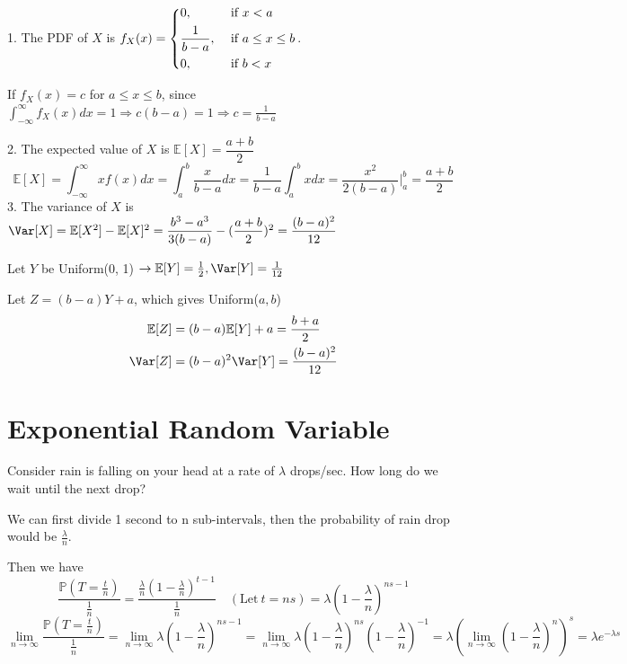 1. The PDF of \(X\) is \(f_X(x) = \begin{dcases}
        0, &\text{ if } x < a \\
        \frac{1}{b - a}, &\text{ if } a \leq x \leq b \\
        0 , &\text{ if } b < x
    \end{dcases}\). 
    
    If \(f_X(x) = c\) for \(a \leq x \leq b\), since \(\displaystyle\int_{-\infty} ^{\infty} f_X(x)dx = 1 \Rightarrow c(b - a) = 1 \Rightarrow c = \frac{1}{b - a}\)

2. The expected value of \(X\) is \(\mathbb{E}[X] = \dfrac{a + b}{2}\)
    \[
        \mathbb{E}[X] = \int_{-\infty} ^{\infty} xf(x)dx = \int_{a} ^{b} \dfrac{x}{b - a}dx = \dfrac{1}{b - a}\int_{a} ^{b} xdx = \dfrac{x^2}{2(b - a)} \Big|_a^b = \dfrac{a + b}{2}
    \]
3. The variance of \(X\) is \(\Var[X] = \mathbb{E}[X^2] - \mathbb{E}[X]^2 = \dfrac{b^3 - a^3}{3(b - a)} - (\dfrac{a + b}{2})^2 = \dfrac{(b - a)^2}{12}\)
    
    Let \(Y\) be Uniform(0, 1) \(\rightarrow \mathbb{E}[Y] = \frac{1}{2}, \Var[Y] = \frac{1}{12}\) 

    Let \(Z = (b - a)Y + a\), which gives Uniform(\(a, b\)) 
    \[
    \begin{aligned}
        \mathbb{E}[Z] &= (b - a)\mathbb{E}[Y] + a = \frac{b + a}{2} \\
        \Var[Z] &= (b - a)^2 \Var[Y] = \frac{(b - a)^2}{12}
    \end{aligned}
    \]

\section{Exponential Random Variable}

Consider rain is falling on your head at a rate of \(\lambda\) drops/sec. How long do we wait until the next drop?

We can first divide 1 second to n sub-intervals, then the probability of rain drop would be \(\frac{\lambda}{n}\). 

Then we have 
\[
    \dfrac{\mathbb{P}(T = \frac{t}{n})}{\frac{1}{n}} = \frac{\frac{\lambda}{n}\left(1 - \frac{\lambda}{n}\right)^{t-1}}{\frac{1}{n}} \quad(\text{Let}\ t = ns) = \lambda\left(1 - \dfrac{\lambda}{n}\right)^{ns-1}
\]
\[
    \lim_{n \to \infty} \dfrac{\mathbb{P}(T = \frac{t}{n})}{\frac{1}{n}} = \lim_{n \to \infty} \lambda\left(1 - \dfrac{\lambda}{n}\right)^{ns-1} = \lim_{n \to \infty} \lambda\left(1 - \dfrac{\lambda}{n}\right)^{ns}\left(1 - \dfrac{\lambda}{n}\right)^{-1} = \lambda \left(\lim_{n \to \infty} \left(1 - \dfrac{\lambda}{n}\right)^n\right)^s = \lambda e^{-\lambda s}
\]

